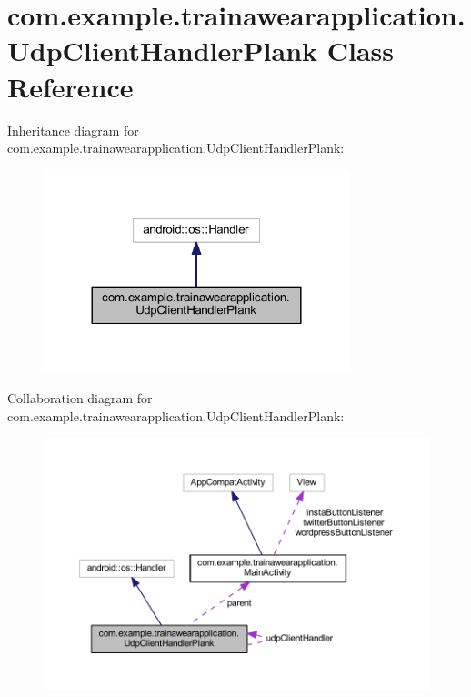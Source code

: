 \hypertarget{classcom_1_1example_1_1trainawearapplication_1_1_udp_client_handler_plank}{}\section{com.\+example.\+trainawearapplication.\+Udp\+Client\+Handler\+Plank Class Reference}
\label{classcom_1_1example_1_1trainawearapplication_1_1_udp_client_handler_plank}


Inheritance diagram for com.\+example.\+trainawearapplication.\+Udp\+Client\+Handler\+Plank\+:
\nopagebreak
\begin{figure}[H]
\begin{center}
\leavevmode
\includegraphics[width=252pt]{classcom_1_1example_1_1trainawearapplication_1_1_udp_client_handler_plank__inherit__graph}
\end{center}
\end{figure}


Collaboration diagram for com.\+example.\+trainawearapplication.\+Udp\+Client\+Handler\+Plank\+:
\nopagebreak
\begin{figure}[H]
\begin{center}
\leavevmode
\includegraphics[width=350pt]{classcom_1_1example_1_1trainawearapplication_1_1_udp_client_handler_plank__coll__graph}
\end{center}
\end{figure}
